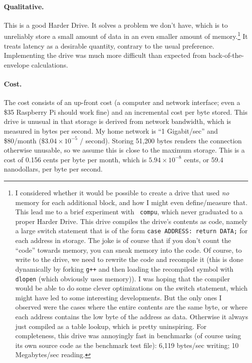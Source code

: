 \documentclass[twocolumn]{article}
\begin{document}
\paragraph{Qualitative.} This is a good Harder Drive. It solves
a problem we don't have, which is to unreliably store a small amount
of data in an even smaller amount of memory.\!\footnote{ I considered
  whether it would be possible to create a drive that used {\em no}
  memory for each additional block, and how I might even
  define/measure that. This lead me to a brief experiment with {\tt
    compu}, which never graduated to a proper Harder Drive. This drive
  compiles the drive's contents as code, namely a large switch
  statement that is of the form \verb+case ADDRESS: return DATA;+ for
  each address in storage. The joke is of course that if you don't
  count the ``code'' towards memory, you can sneak memory into the
  code. Of course, to write to the drive, we need to rewrite the code
  and recompile it (this is done dynamically by forking \verb|g++| and
  then loading the recompiled symbol with \verb|dlopen| (which
  obviously uses memory)). I was hoping that the compiler would be
  able to do some clever optimizations on the switch statement, which
  might have led to some interesting developments. But the only ones I
  observed were the cases where the entire contents are the same byte,
  or where each address contains the low byte of the address as data.
  Otherwise it always just compiled as a table lookup, which is pretty
  uninspiring. For completeness, this drive was annoyingly fast in
  benchmarks (of course using its own source code as the benchmark
  test file): 6,119 bytes/sec writing; 10 Megabytes/sec reading. } It
treats latency as a desirable quantity, contrary to the usual
preference. Implementing the drive was much more difficult than
expected from back-of-the-envelope calculations.

\paragraph{Cost.} The cost consists of an up-front cost (a computer
and network interface; even a \$35 Raspberry Pi should work fine) and
an incremental cost per byte stored. This drive is unusual in that
storage is derived from network bandwidth, which is measured in bytes
per second. My home network is ``1 Gigabit/sec'' and \$80/month
($\$3.04 \times 10^{-5}$ / second). Storing 51,200 bytes renders the
connection otherwise unusable, so we assume this is close to the
maximum storage. This is a cost of 0.156 cents per byte per month,
which is $5.94 \times 10^{-8}$ cents, or 59.4 nanodollars, per byte
per second.
\end{document}
